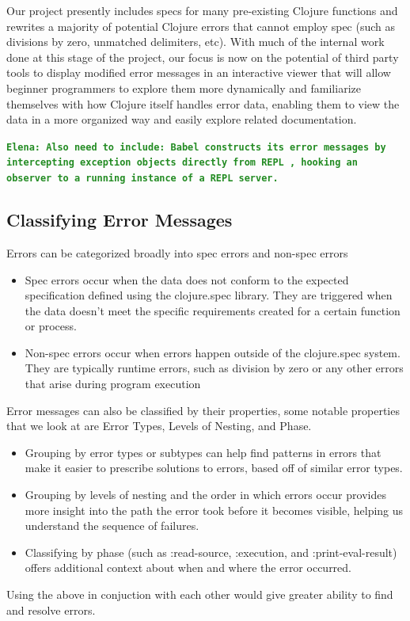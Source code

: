 \documentclass[12pt]{article}
\newcommand{\comment}[1]{{\bf \tt  {#1}}}
\newcommand{\emcomment}[1]{\textcolor{ForestGreen}{\comment{Elena: {#1}}}}
\begin{document}
Our project presently includes specs for many pre-existing Clojure functions and rewrites a majority of potential Clojure errors that cannot employ spec (such as divisions by zero, unmatched delimiters, etc). With much of the internal work done at this stage of the project, our focus is now on the potential of third party tools to display modified error messages in an interactive viewer that will allow beginner programmers to explore them more dynamically and familiarize themselves with how Clojure itself handles error data, enabling them to view the data in a more organized way and easily explore related documentation.

\emcomment{Also need to include:
Babel constructs its error messages by intercepting exception objects directly from REPL , hooking an observer to a running instance of a REPL server.}

\subsection{Classifying Error Messages}\label{subsec:classification}

Errors can be categorized broadly into spec errors and non-spec errors
\begin{itemize}

	\item Spec errors occur when the data does not conform to the expected specification defined using the clojure.spec library. They are triggered when the data doesn't meet the specific requirements created for a certain function or process.
	
	\item Non-spec errors occur when errors happen outside of the clojure.spec system. They are typically runtime errors, such as division by zero or any other errors that arise during program execution

\end{itemize}

Error messages can also be classified by their properties, some notable properties that we look at are Error Types, Levels of Nesting, and Phase.
\begin{itemize}
	\item Grouping by error types or subtypes can help find patterns in errors that make it easier to prescribe solutions to errors, based off of similar error types.
	\item Grouping by levels of nesting and the order in which errors occur provides more insight into the path the error took before it becomes visible, helping us understand the sequence of failures.
	\item Classifying by phase (such as :read-source, :execution, and :print-eval-result) offers additional context about when and where the error occurred.
\end{itemize}
Using the above in conjuction with each other would give greater ability to find and resolve errors.
\end{document}
